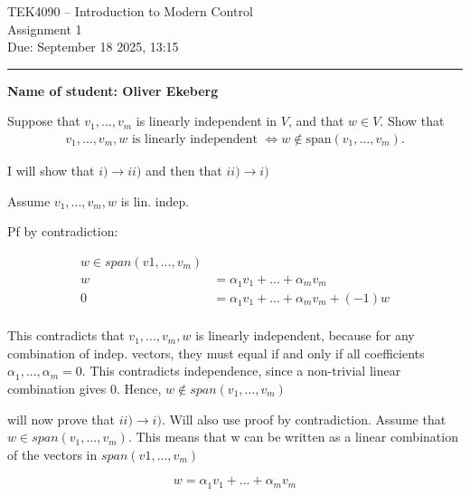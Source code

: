 \documentclass[12pt,A4, onecolumn]{exam}
\begin{document}
\begingroup  
    \centering
    \LARGE TEK4090 -- Introduction to Modern Control\\
    \LARGE Assignment 1\\[0.5em]
    \large Due: September 18 2025, 13:15\\
\endgroup

\rule{\textwidth}{0.4pt}
\printanswers

\textbf{Name of student: Oliver Ekeberg}

\renewcommand{\solutiontitle}{\noindent\textbf{Ans:}\enspace}   %

\begin{questions}

  \question[10] Suppose that $v_1,\dots,v_m$ is linearly independent in $V$, and that $w\in V$. Show that
    \begin{align}
      v_1,\dots,v_m, w \text{ is linearly independent } \iff w\notin \mathrm{span}(v_1,\dots,v_m).
    \end{align}


  \begin{solution}
    I will show that $ i) \rightarrow ii) $ and then that $ ii) \rightarrow i) $ 
    
    Assume $ v_1, ... , v_m, w $ is lin. indep.
    
    Pf by contradiction:

    \begin{align*}
      w \in span(v1, ..., v_m) \\
       w &= \alpha_{1}^{} v_1 + ... + \alpha_{m}^ {} v_m  \\
       0 &= \alpha_{1}^{} v_1 + ... + \alpha_{m}^ {} v_m  + (-1) w\\
    \end{align*}

    This contradicts that $ v_1, ..., v_m, w $ is linearly independent, because for any combination of indep. vectors, they must equal if and only if all coefficients $ \alpha_{1}^{} , ..., \alpha_{m}^{} = 0  $. This contradicts independence, since a non-trivial linear combination gives 0. Hence, $ w \notin span(v_1, ..., v_m) $    

    will now prove that $ ii) \rightarrow i) $. Will also use proof by contradiction. Assume that $ w \in span(v_1, ..., v_m) $. This means that w can be written as a linear combination of the vectors in $ span(v1, ..., v_m) $ 

    \[
       w = \alpha_{1}^{} v_1 + ... + \alpha_{m}^{} v_m
    \]


\end{solution}
\end{questions}
\end{document}

